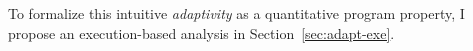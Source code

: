 \begin{enumerate}
To formalize this intuitive \emph{adaptivity} as a quantitative program property, 
I propose an execution-based analysis in Section~\ref{sec:adapt-exe}.

\end{enumerate}
